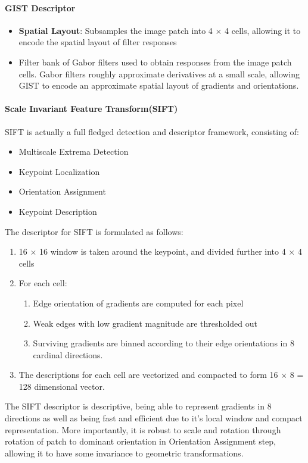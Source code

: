 \documentclass[12pt]{article}
\begin{document}
\paragraph{GIST Descriptor}
\begin{itemize}
\item \textbf{Spatial Layout}: Subsamples the image patch into 4 $\times$ 4 cells, allowing it to encode the spatial layout of filter responses
\item Filter bank of Gabor filters used to obtain responses from the image patch cells. Gabor filters roughly approximate derivatives at a small scale, allowing GIST to encode an approximate spatial layout of gradients and orientations.
\end{itemize}

\paragraph{Scale Invariant Feature Transform(SIFT)}
SIFT is actually a full fledged detection and descriptor framework, consisting of:
\begin{itemize}
\item Multiscale Extrema Detection
\item Keypoint Localization
\item Orientation Assignment
\item Keypoint Description
\end{itemize}

The descriptor for SIFT is formulated as follows:
\begin{enumerate}
\item 16 $\times$ 16 window is taken around the keypoint, and divided further into 4 $\times$ 4 cells
\item For each cell:
\begin{enumerate}
\item Edge orientation of gradients are computed for each pixel
\item Weak edges with low gradient magnitude are thresholded out
\item Surviving gradients are binned according to their edge orientations in 8 cardinal directions.
\end{enumerate}
\item The descriptions for each cell are vectorized and compacted to form 16 $\times$ 8 = 128 dimensional vector.
\end{enumerate}

The SIFT descriptor is descriptive, being able to represent gradients in 8 directions as well as being fast and efficient due to it's local window and compact representation. More importantly, it is robust to scale and rotation through rotation of patch to dominant orientation in Orientation Assignment step, allowing it to have some invariance to geometric transformations.
\end{document}
